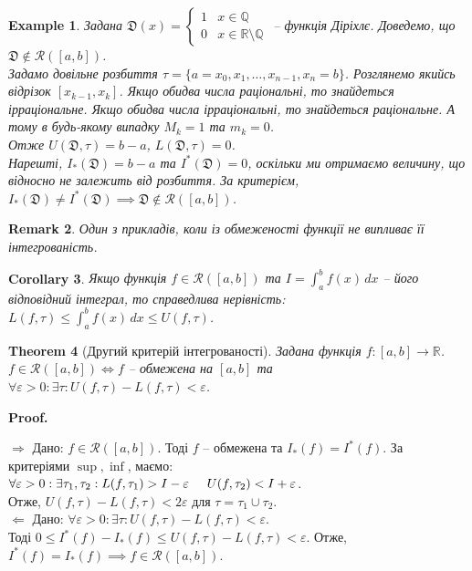 \documentclass[a4paper, 10pt]{article}
\makeatletter
\def\huge{\displaystyle}
\def\rightproof{$\boxed{\Rightarrow}$ }
\def\leftproof{$\boxed{\Leftarrow}$ }
\theoremstyle{theoremdd}
\newtheorem{theorem}{Theorem}[subsection]
\theoremstyle{theoremdd}
\theoremstyle{theoremdd}
\theoremstyle{theoremdd}
\theoremstyle{theoremdd}
\newtheorem{example}[theorem]{Example}
\theoremstyle{theoremdd}
\theoremstyle{theoremdd}
\newtheorem{remark}[theorem]{Remark}
\theoremstyle{theoremdd}
\theoremstyle{theoremdd}
\newtheorem{corollary}[theorem]{Corollary}
\renewenvironment{proof}[1][Proof.\\]{\par
\pushQED{\hfill \qed}%
\normalfont \topsep6\p@\@plus6\p@\relax
\trivlist
\item\relax
{\bfseries
#1\@addpunct{.}}\hspace\labelsep\ignorespaces
}{%
\popQED\endtrivlist\@endpefalse
}
\makeatother
\begin{document}
\begin{example}
Задана $\mathfrak{D}(x) = \begin{cases} 1 & x \in \mathbb{Q} \\ 0 & x \in \mathbb{R} \setminus \mathbb{Q} \end{cases}$ -- функція Діріхлє. Доведемо, що $\mathfrak{D} \notin \mathcal{R}([a,b])$.\\
Задамо довільне розбиття $\tau = \{a = x_0,x_1,\dots,x_{n-1},x_n = b\}$. Розглянемо якийсь відрізок $[x_{k-1},x_k]$. Якщо обидва числа раціональні, то знайдеться ірраціональне. Якщо обидва числа ірраціональні, то знайдеться раціональне. А тому в будь-якому випадку $M_k =1$ та $m_k = 0$.\\
Отже $U(\mathfrak{D},\tau) = b-a$, \hspace{1cm} $L(\mathfrak{D},\tau) = 0$.\\
Нарешті, $I_*(\mathfrak{D}) = b-a$ та $I^*(\mathfrak{D}) = 0$, оскільки ми отримаємо величину, що відносно не залежить від розбиття. За критерієм, $I_*(\mathfrak{D}) \neq I^*(\mathfrak{D}) \implies \mathfrak{D} \not\in \mathcal{R}([a,b])$.
\end{example}

\begin{remark}
Один з прикладів, коли із обмеженості функції не випливає її інтегрованість.
\end{remark}

\begin{corollary}
Якщо функція $f \in \mathcal{R}([a,b])$ та $I = \huge\int_a^b f(x)\,dx$ -- його відповідний інтеграл, то справедлива нерівність: $L(f,\tau) \leq \huge\int_a^b f(x)\,dx \leq U(f, \tau)$.
\end{corollary}

\begin{theorem}[Другий критерій інтегрованості]
Задана функція $f \colon [a,b] \to \mathbb{R}$.\\
$f \in \mathcal{R}([a,b]) \iff f$ -- обмежена на $[a,b]$ та $\forall \varepsilon > 0: \exists \tau: U(f,\tau) - L(f,\tau) < \varepsilon$.
\end{theorem}

\begin{proof}
\rightproof Дано: $f \in \mathcal{R}([a,b])$. Тоді $f$ -- обмежена та $I_*(f)=I^*(f)$. За критеріями $\sup,\inf$, маємо:\\
$\forall \varepsilon > 0: \exists \tau_1,\tau_2: L(f,\tau_1) > I - \varepsilon \hspace{0.5cm} U(f,\tau_2) < I + \varepsilon$.\\
Отже, $U(f,\tau) - L(f,\tau) < 2\varepsilon$ для $\tau = \tau_1 \cup \tau_2$.
\bigskip \\
\leftproof Дано: $\forall \varepsilon > 0: \exists \tau: U(f, \tau) - L(f,\tau) < \varepsilon$.\\
Тоді $0 \leq I^*(f) - I_*(f) \leq U(f, \tau) - L(f,\tau) < \varepsilon$. Отже, $I^*(f) = I_*(f) \implies f \in \mathcal{R}([a,b])$.
\end{proof}
\end{document}
